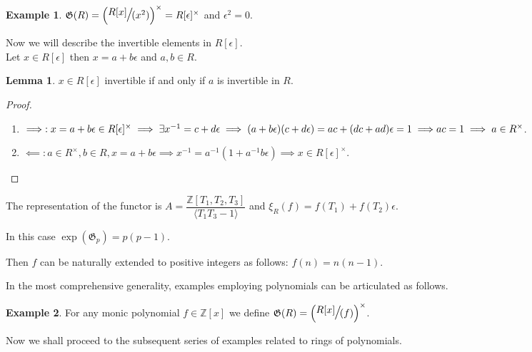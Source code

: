 \documentclass{article}
\theoremstyle{definition}
\newtheorem{example}{Example}
\theoremstyle{definition}
\newtheorem{lemma}{Lemma}
\begin{document}
\begin{example}
    $\mathfrak{G}(R) = \Large{\left( \sfrac{R[x]}{ (x^2)}\right)^{\times}} =  R[\epsilon]^{\times}$ and $\epsilon^2 = 0$.

 Now we will describe the invertible elements in $R[\epsilon].$\\
    Let $x \in  R[\epsilon]$ then $x = a + b\epsilon$ and $a,b \in R.$
 \begin{lemma}
        $x \in R[\epsilon]$ invertible if and only if $a$ is invertible in $R$.
    \end{lemma}
\begin{proof}
\hspace*{5cm}
\begin{enumerate}
    \item $\implies: x = a + b\epsilon \in R[\epsilon]^{\times} \implies \exists x^{-1} = c + d\epsilon \implies 
    (a+b\epsilon)(c +d\epsilon) = ac + (dc+ ad)\epsilon = 1 \implies\\
    ac = 1\implies a \in R^{\times}$.
    \item  $\impliedby: a \in R^{\times}, b \in R, x = a + b\epsilon \implies x^{-1} = a^{-1}(1 + a^{-1}b\epsilon) 
    \implies x  \in R[\epsilon]^{\times}.$
\end{enumerate}
\end{proof}

The representation of the functor is $A = \dfrac{\mathbb{Z}[T_1, T_2, T_3]}{\langle T_1T_3-1\rangle}$ and 
$\xi_R(f)=f(T_1)+f(T_2)\epsilon$.

In this case $\operatorname{exp}(\mathfrak{G}_p) = p(p - 1).$

Then $f$ can be naturally extended to positive integers as follows: $f(n) = n(n - 1)$.\\
\end{example}

In the most comprehensive generality, examples employing polynomials can be articulated as follows.
\begin{example} For any monic polynomial $f \in \mathbb{Z}[x]$ we define
    $\mathfrak{G}(R) =\Large{\left( \sfrac{R[x]}{(f)}\right)^{\times}}$.
\end{example}

Now we shall proceed to the subsequent series of examples related to rings of polynomials.
    
\end{document}
